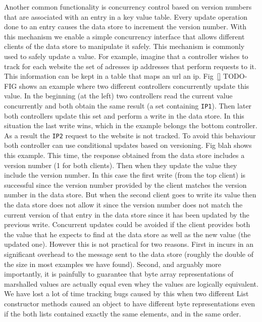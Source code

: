 \documentclass[12pt,openright,twoside]{report}
\begin{document}
Another common functionality is concurrency control based on version numbers that are associated with an entry in a key value table.
Every update operation done to an entry causes the data store to increment the version number. 
With this mechanism we enable a simple concurrency interface that allows different clients of the data store to manipulate it safely. 
This mechanism is commonly used to safely update a value.  
For example, imagine that a controller wishes to track for each website the set of adresses \gls{ip} addresses that perform requests to it. 
This information can be kept in a table that maps  an \gls{url} an \gls{ip}.  Fig~\ref{} TODO-FIG shows an example where two different controllers concurrently update this value. 
In the beginning (at the left) two controllers read the current value concurrently and both obtain the same result (a set containing \texttt{IP1}). Then later both controllers update this set and perform a write in the data store. In this situation the last write wins, which in the example belongs the bottom controller. 
As a result the \texttt{IP2} request to the website is not tracked. To avoid this behaviour both controller can use conditional updates based on versioning. 
Fig blah shows this example. This time, the response obtained from the data store includes a version number (1 for both clients). Then when they update the value they include the version number. In this case the first write (from the top client) is successful since the version number provided by the client matches the version number in the data store. But when the second client goes to write its  value then the data store does not allow it since the version number does not match the current version of that entry in the data store since it has been updated by the previous write. 
Concurrent updates could be avoided if the client provides both the value that he expects to find at the data store as well as the new value (the updated one). However this is not practical for two reasons. First in incurs in an significant overhead to the message sent to the data store (roughly the double of the size in most examples we have found). Second, and arguably more importantly, it is painfully to guarantee that byte array representations of marshalled values are actually equal even whey the values are logically equivalent. We have lost a lot of time tracking bugs caused by this when two different List constructor methods caused an object to have different byte representations even if the both lists contained exactly the same elements, and in the same order. 
\end{document}
